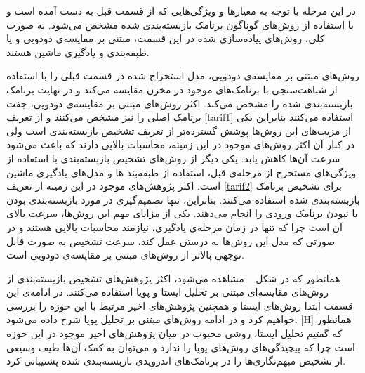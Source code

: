در این مرحله با توجه به معیار‌ها و ویژگی‌هایی که از قسمت قبل به دست آمده است و با استفاده از روش‌های گوناگون برنامک بازبسته‌بندی شده مشخص می‌شود. به صورت کلی، روش‌های پیاده‌سازی شده در این قسمت، مبتنی بر مقایسه‌ی دودویی و یا طبقه‌بندی و یادگیری ماشین هستند.

 روش‌های مبتنی بر مقایسه‌ی دودویی، مدل استخراج شده در قسمت قبلی را با استفاده از شباهت‌سنجی با برنامک‌های موجود در مخزن مقایسه می‌کند و در نهایت برنامک بازبسته‌بندی شده را مشخص می‌کند. اکثر روش‌های مبتنی بر مقایسه‌ی دودویی، جفت برنامک اصلی را نیز مشخص می‌کنند و از تعریف
\ref{tarif1}
استفاده می‌کنند بنابراین یکی از مزیت‌های این روش‌ها پوشش گسترده‌تر از تعریف تشخیص بازبسته‌بندی است ولی در کنار آن اکثر روش‌های موجود در این زمینه، محاسبات بالایی دارند که باعث می‌شود سرعت آن‌ها کاهش یابد.
 یکی دیگر از روش‌های تشخیص بازبسته‌بندی با استفاده از ویژگی‌های مستخرج از مرحله‌ی قبل، استفاده از طبقه‌بند ها و مدل‌های یادگیری ماشین است. اکثر پژوهش‌های موجود در این زمینه از تعریف
\ref{tarif2}
برای تشخیص برنامک بازبسته‌بندی شده استفاده می‌کنند. بنابراین، تنها تصمیم‌گیری در مورد بازبسته‌بندی بودن یا نبودن برنامک ورودی را انجام می‌دهند. یکی از مزایای مهم این رو‌ش‌ها، سرعت بالای آن است چرا که تنها در زمان مرحله‌ی یادگیری، نیازمند محاسبات بالایی هستند و در صورتی که مدل این روش‌ها به درستی عمل کند، سرعت تشخیص به صورت قابل توجهی بالاتر از روش‌های مبتنی بر مقایسه‌ی دودویی است.

همانطور که در شکل ~ مشاهده می‌شود، اکثر پژوهش‌های تشخیص بازبسته‌بندی از روش‌های مقایسه‌ای مبتنی بر تحلیل ایستا و پویا استفاده می‌کنند. در ادامه‌ی این قسمت ابتدا روش‌های ایستا و همچنین پژوهش‌های اخیر مرتبط با این حوزه را بررسی خواهیم کرد و در ادامه روش‌های مبتنی بر تحلیل پویا شرح داده می‌شود.
[H]
\vspace{1em}
همانطور که گفتیم تحلیل ایستا، روشی محبوب در میان پژوهش‌های اخیر موجود در این حوزه است چرا که پیچیدگی‌های روش‌های پویا را ندارد و می‌توان به کمک آن‌ها طیف وسیعی از تشخیص مبهم‌نگاری‌ها را در برنامک‌های اندرویدی بازبسته‌بندی شده پشتیبانی کرد.

